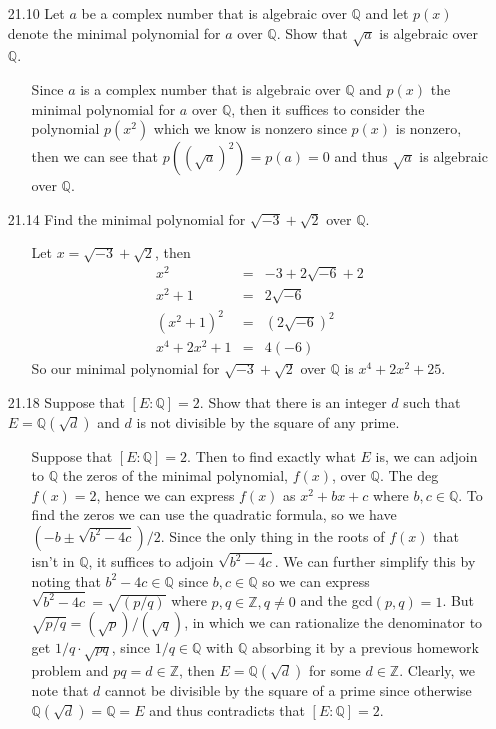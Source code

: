 \documentclass[12pt]{article}
\begin{document}
\begin{enumerate}
\item[21.10] Let $a$ be a complex number that is algebraic over $\mathbb{Q}$ and let $p(x)$ denote
the minimal polynomial for $a$ over $\mathbb{Q}$. Show that $\sqrt{a}$ is algebraic over $\mathbb{Q}$.
\begin{enumerate}
\item[] Since $a$ is a complex number that is algebraic over $\mathbb{Q}$ and 
$p(x)$ the minimal polynomial for $a$ over $\mathbb{Q}$, then it suffices to consider
the polynomial $p(x^2)$ which we know is nonzero since $p(x)$ is nonzero, then we can
see that $p((\sqrt{a})^2) = p(a) = 0$ and thus $\sqrt{a}$ is algebraic over $\mathbb{Q}$.
\end{enumerate}

\item[21.14] Find the minimal polynomial for $\sqrt{-3} + \sqrt{2}$ over $\mathbb{Q}$.
\begin{enumerate}
\item[] Let $x = \sqrt{-3} + \sqrt{2}$, then 
\begin{eqnarray*}
x^2 &=& -3 + 2\sqrt{-6} + 2 \\
x^2 + 1 &=& 2\sqrt{-6} \\
(x^2 + 1)^2 &=& (2\sqrt{-6})^2 \\
x^4 + 2x^2 + 1 &=& 4(-6)
\end{eqnarray*}
So our minimal polynomial for $\sqrt{-3} + \sqrt{2}$ over $\mathbb{Q}$ is $x^4 + 2x^2 + 25$.
\end{enumerate}

\item[21.18] Suppose that $[E:\mathbb{Q}] = 2$. Show that there is an integer $d$ such that
$E = \mathbb{Q}(\sqrt{d})$ and $d$ is not divisible by the square of any prime.
\begin{enumerate}
\item[] Suppose that $[E : \mathbb{Q}] = 2$. Then to find exactly what $E$ is, we can
adjoin to $\mathbb{Q}$ the zeros of the minimal polynomial, $f(x)$, over $\mathbb{Q}$. 
The deg $f(x) = 2$, hence we can express $f(x)$ as $x^2 + bx + c$ 
where $b,c \in \mathbb{Q}$. To find the zeros we can use the quadratic formula, so we have
$(-b \pm \sqrt{b^2 - 4c})/2$. Since the only thing in the roots of $f(x)$ that isn't
in $\mathbb{Q}$, it suffices to adjoin $\sqrt{b^2 - 4c}$. We can further simplify this
by noting that $b^2 - 4c \in \mathbb{Q}$ since $b, c \in \mathbb{Q}$ so we can express
$\sqrt{b^2 - 4c} = \sqrt{(p/q)}$ where $p, q \in \mathbb{Z}, q \neq 0$ and the
gcd$(p, q) = 1$. But $\sqrt{p/q} = (\sqrt{p})/(\sqrt{q})$, in which we can rationalize the
denominator to get $1/q \cdot \sqrt{pq}$, since $1/q \in \mathbb{Q}$ with $\mathbb{Q}$
absorbing it by a previous homework problem and $pq = d \in \mathbb{Z}$, then $E = 
\mathbb{Q}(\sqrt{d})$ for some $d \in \mathbb{Z}$. Clearly, we note that $d$ cannot be
divisible by the square of a prime since otherwise $\mathbb{Q}(\sqrt{d}) = \mathbb{Q} = E$ and thus
contradicts that $[E : \mathbb{Q}] = 2$.
\end{enumerate}


\end{enumerate}
\end{document}
